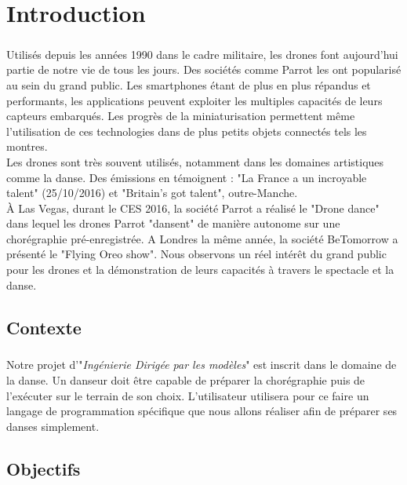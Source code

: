 \documentclass[12pt, openany]{report}
\begin{document}
\tableofcontents



\chapter{Introduction}
\paragraph{}
Utilisés depuis les années 1990 dans le cadre militaire, les drones font aujourd'hui partie de notre vie de tous les jours. Des sociétés comme Parrot les ont popularisé au sein du grand public. Les smartphones étant de plus en plus répandus et performants, les applications peuvent exploiter les multiples capacités de leurs capteurs embarqués. Les progrès de la miniaturisation permettent même l'utilisation de ces technologies dans de plus petits objets connectés tels les montres.\\
Les drones sont très souvent utilisés, notamment dans les domaines artistiques comme la danse. Des émissions en témoignent : "La France a un incroyable talent" (25/10/2016) et "Britain's got talent", outre-Manche.\\À Las Vegas, durant le CES 2016, la société Parrot a réalisé le "Drone dance" dans lequel les drones Parrot "dansent" de manière autonome sur une chorégraphie pré-enregistrée. A Londres la même année, la société BeTomorrow a présenté le "Flying Oreo show". 
Nous observons un réel intérêt du grand public pour les drones et la démonstration de leurs capacités à travers le spectacle et la danse.

\section{Contexte}
\paragraph{}
Notre projet d'"\textit{Ingénierie Dirigée par les modèles}" est inscrit dans le domaine de la danse. Un danseur doit être capable de préparer la chorégraphie puis de l'exécuter sur le terrain de son choix. L'utilisateur utilisera pour ce faire un langage de programmation spécifique que nous allons réaliser afin de préparer ses danses simplement. 

\section{Objectifs}
\end{document}
